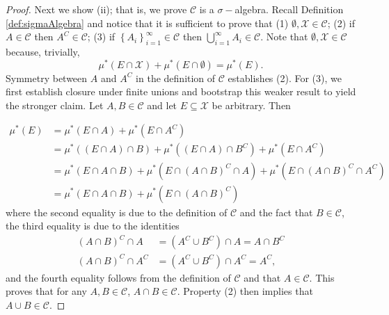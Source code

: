 \begin{proof}
Next we show (ii); that is, we prove $\mathcal{C}$ is a $\sigma-$algebra.
Recall Definition \ref{def:sigmaAlgebra} and notice that it is sufficient
to prove that (1) $\emptyset,\mathcal{X}\in\mathcal{C}$; (2) if $A\in\mathcal{C}$
then $A^{C}\in\mathcal{C}$; (3) if $\left\{ A_{i}\right\} _{i=1}^{\infty}\in\mathcal{C}$
then $\bigcup_{i=1}^{\infty}A_{i}\in\mathcal{C}.$ Note that $\emptyset,\mathcal{X}\in\mathcal{C}$
because, trivially,
\[
\mu^{*}\left(E\cap\mathcal{X}\right)+\mu^{*}\left(E\cap\emptyset\right)=\mu^{*}\left(E\right).
\]
Symmetry between $A$ and $A^{C}$ in the definition of $\mathcal{C}$
establishes (2). For (3), we first establish closure under finite
unions and bootstrap this weaker result to yield the stronger claim.
Let $A,B\in\mathcal{C}$ and let $E\subseteq\mathcal{X}$ be arbitrary.
Then

\begin{align*}
\mu^{*}\left(E\right) & =\mu^{*}\left(E\cap A\right)+\mu^{*}\left(E\cap A^{C}\right)\\
 & =\mu^{*}\left(\left(E\cap A\right)\cap B\right)+\mu^{*}\left(\left(E\cap A\right)\cap B^{C}\right)+\mu^{*}\left(E\cap A^{C}\right)\\
 & =\mu^{*}\left(E\cap A\cap B\right)+\mu^{*}\left(E\cap\left(A\cap B\right)^{C}\cap A\right)+\mu^{*}\left(E\cap\left(A\cap B\right)^{C}\cap A^{C}\right)\\
 & =\mu^{*}\left(E\cap A\cap B\right)+\mu^{*}\left(E\cap\left(A\cap B\right)^{C}\right)
\end{align*}
where the second equality is due to the definition of $\mathcal{C}$
and the fact that $B\in\mathcal{\mathcal{C}}$, the third equality
is due to the identities
\begin{align*}
\left(A\cap B\right)^{C}\cap A & =\left(A^{C}\cup B^{C}\right)\cap A=A\cap B^{C}\\
\left(A\cap B\right)^{C}\cap A^{C} & =\left(A^{C}\cup B^{C}\right)\cap A^{C}=A^{C},
\end{align*}
and the fourth equality follows from the definition of $\mathcal{C}$
and that $A\in\mathcal{C}$. This proves that for any $A,B\in\mathcal{C}$,
$A\cap B\in\mathcal{C}.$ Property (2) then implies that $A\cup B\in\mathcal{C}.$


\end{proof}
